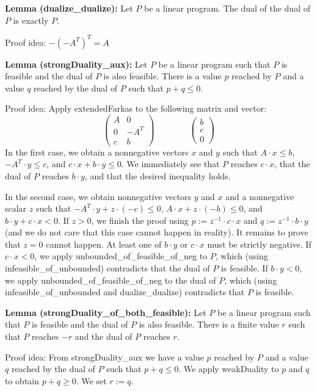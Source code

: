 \documentclass[]{article}
\renewcommand{\.}{\hskip .75pt}
\let\*=\cdot
\begin{document}
\medskip \noindent
\textbf{Lemma (dualize\_dualize):}
Let $P$ be a linear program. The dual of the dual of $P$ is exactly $P$.

\medskip \noindent
Proof idea:
$ -(-A^T)^T = A $

\medskip \noindent
\textbf{Lemma (strongDuality\_aux):}
Let $P$ be a linear program such that
$P$ is feasible and the dual of $P$ is also feasible.
There is a value $p$ reached by $P$ and
a value $q$ reached by the dual of $P$ such
that $p + q \le 0$.

\medskip \noindent
Proof idea:
Apply extendedFarkas to the following matrix and vector:
$$
\begin{pmatrix}
	A & 0 \\
	0 & -A^T \\
	c & b
\end{pmatrix}
\qquad \qquad
\begin{pmatrix}
	b \\
	c \\
	0
\end{pmatrix}
$$
In the first case, we obtain a nonnegative vectors $x$ and $y$
such that $A \* x \le b$, $-A^T \* y \le c$, and
$c \* x + b \* y \le 0$.
We immediately see that $P$ reaches $c \* x$,
that the dual of $P$ reaches $b \* y$,
and that the desired inequality holds.

In the second case, we obtain nonnegative vectors $y$ and $x$ and
a nonnegative scalar $z$ such that
$-\!A^T \* y + z \* (-c) \le 0$, $A \* x + z \* (-b) \le 0$,
and $b \* y + c \* x < 0$.
If $z > 0$, we finish the proof using $p := z^{-1} \* c \* x$
and $q := z^{-1} \* b \* y$ (and we do not care that this case
cannot happen in reality).
It remains to prove that $z=0$ cannot happen.
At least one of $b \* y$ or $c \* x$ must be strictly negative.
If $c \* x < 0$, we apply unbounded\_of\_feasible\_of\_neg to
$P$, which (using infeasible\_of\_unbounded) contradicts
that the dual of $P$ is feasible.
If $b \* y < 0$, we apply unbounded\_of\_feasible\_of\_neg to
the dual of $P$, which (using infeasible\_of\_unbounded and
dualize\_dualize) contradicts that $P$ is feasible.

\medskip \noindent
\textbf{Lemma (strongDuality\_of\_both\_feasible):}
Let $P$ be a linear program such that
$P$ is feasible and the dual of $P$ is also feasible.
There is a finite value $r$ such that
$P$ reaches $-r$ and the dual of $P$ reaches $r$.

\medskip \noindent
Proof idea:
From strongDuality\_aux we have a value $p$ reached by $P$ and
a value $q$ reached by the dual of $P$ such that $p + q \le 0$.
We apply weakDuality to $p$ and $q$ to obtain $p + q \ge 0$.
We set $r := q$.
\end{document}
